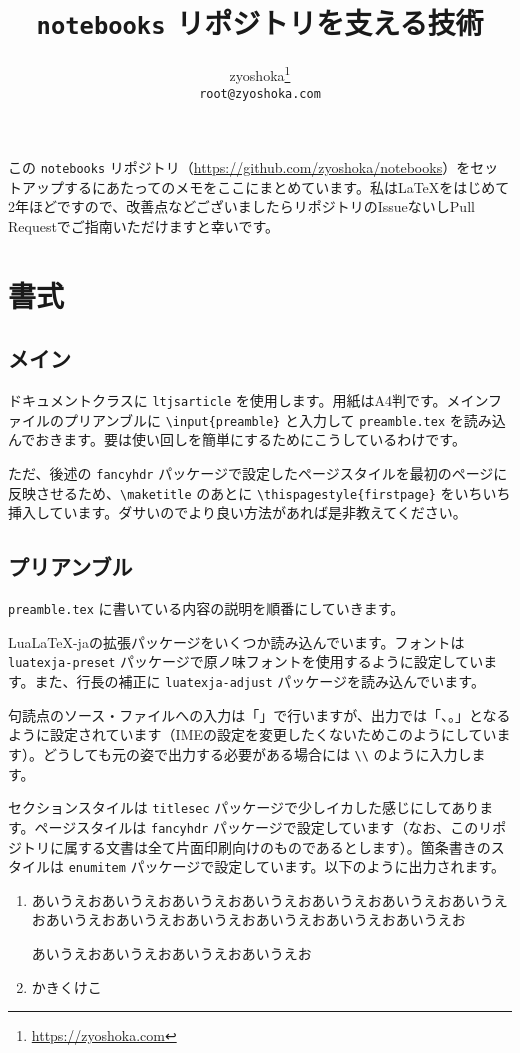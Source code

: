 \documentclass[a4paper]{ltjsarticle}
\begin{document}
\title{\texttt{notebooks} リポジトリを支える技術}
\author{zyoshoka\thanks{\url{https://zyoshoka.com}}\\\texttt{root@zyoshoka.com}}
\maketitle
\thispagestyle{firstpage}

この \texttt{notebooks} リポジトリ（\url{https://github.com/zyoshoka/notebooks}）をセットアップするにあたってのメモをここにまとめています。私は\LaTeX をはじめて2年ほどですので、改善点などございましたらリポジトリのIssueないしPull Requestでご指南いただけますと幸いです。

\section{書式}

\subsection{メイン}
ドキュメントクラスに \texttt{ltjsarticle} を使用します。用紙はA4判です。メインファイルのプリアンブルに \texttt{\textbackslash input\{preamble\}} と入力して \texttt{preamble.tex} を読み込んでおきます。要は使い回しを簡単にするためにこうしているわけです。

ただ、後述の \texttt{fancyhdr} パッケージで設定したページスタイルを最初のページに反映させるため、\texttt{\textbackslash maketitle} のあとに \texttt{\textbackslash thispagestyle\{firstpage\}} をいちいち挿入しています。ダサいのでより良い方法があれば是非教えてください。

\subsection{プリアンブル}
\texttt{preamble.tex} に書いている内容の説明を順番にしていきます。

Lua\LaTeX-jaの拡張パッケージをいくつか読み込んでいます。フォントは \texttt{luatexja-preset} パッケージで原ノ味フォントを使用するように設定しています。また、行長の補正に \texttt{luatexja-adjust} パッケージを読み込んでいます。

句読点のソース・ファイルへの入力は「\、\。」で行いますが、出力では「、。」となるように設定されています（IMEの設定を変更したくないためこのようにしています）。どうしても元の姿で出力する必要がある場合には \texttt{\textbackslash\、\textbackslash\。} のように入力します。

セクションスタイルは \texttt{titlesec} パッケージで少しイカした感じにしてあります。ページスタイルは \texttt{fancyhdr} パッケージで設定しています（なお、このリポジトリに属する文書は全て片面印刷向けのものであるとします）。箇条書きのスタイルは \texttt{enumitem} パッケージで設定しています。以下のように出力されます。
\begin{enumerate}
  \item あいうえおあいうえおあいうえおあいうえおあいうえおあいうえおあいうえおあいうえおあいうえおあいうえおあいうえおあいうえおあいうえお

  あいうえおあいうえおあいうえおあいうえお
  \item かきくけこ
\end{enumerate}
\end{document}
